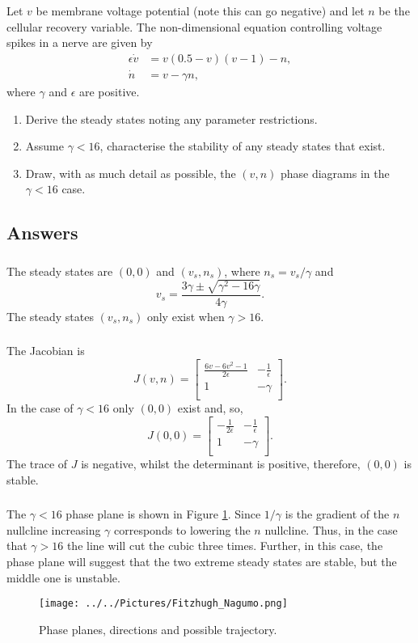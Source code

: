 \documentclass[]{article}
\newcommand{\bb}{\begin{equation}}
\newcommand{\ee}{\end{equation}}
\newcommand{\fig}[1]{Figure \ref{#1}}
\newcommand{\ttp}{.45\textwidth}
\begin{document}
Let $v$ be membrane voltage potential (note this can go negative) and let $n$ be the cellular recovery variable. The non-dimensional equation controlling voltage spikes in a nerve are given by
\begin{align}
\epsilon \dot{v}&=v(0.5-v)(v-1)-n,\label{v}\\
\dot{n}&=v-\gamma n,\label{n}
\end{align}
where $\gamma$ and $\epsilon$ are positive.
\begin{enumerate}
\item Derive the steady states noting any parameter restrictions.
\item Assume $\gamma<16$, characterise the stability of any steady states that exist.
\item Draw, with as much detail as possible, the $(v,n)$ phase diagrams in the $\gamma<16$ case.
\end{enumerate}
\begin{Answ}
\subsection{Answers}
\subsubsection{}
The steady states are $(0,0)$ and $(v_s,n_s)$, where $n_s=v_s/\gamma$ and
\bb
v_s=\frac{3\gamma\pm\sqrt{\gamma^2-16\gamma}}{4\gamma}.
\ee
The steady states $(v_s,n_s)$ only exist when $\gamma>16$.
\subsubsection{}
The Jacobian is
\bb
J(v,n)=\left[ {\begin{array}{cc}
   \frac{6v-6v^2-1}{2\epsilon} & -\frac{1}{\epsilon} \\
   1 & -\gamma \\
  \end{array} } \right].
\ee
In the case of $\gamma<16$ only $(0,0)$ exist and, so,
\bb
J(0,0)=\left[ {\begin{array}{cc}
   -\frac{1}{2\epsilon}&-\frac{1}{\epsilon} \\
   1 & -\gamma \\
  \end{array} } \right].
\ee
The trace of $J$ is negative, whilst the determinant is positive, therefore, $(0,0)$ is stable.
\subsubsection{}
The $\gamma<16$ phase plane is shown in \fig{Fitzhugh_Nagumo}. Since $1/\gamma$ is the gradient of the $n$ nullcline increasing $\gamma$ corresponds to lowering the $n$ nullcline. Thus, in the case that $\gamma>16$ the line will cut the cubic three times. Further, in this case, the phase plane will suggest that the two extreme steady states are stable, but the middle one is unstable.
\begin{figure}[h!!!tb]
\centering
\texttt{[image: ../../Pictures/Fitzhugh\_Nagumo.png]}
\caption{Phase planes, directions and possible trajectory.\label{Fitzhugh_Nagumo}}
\end{figure}
\end{Answ}
\end{document}
